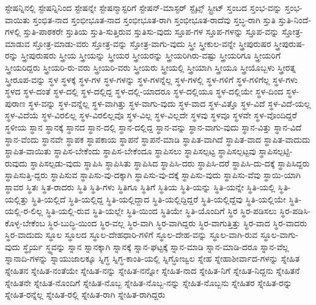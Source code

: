 {ಸ್ಟೇಷನ್ನಿನಲ್ಲಿ
ಸ್ಟೇಷನ್ನಿನಿಂದ
ಸ್ಟೇಷನ್ನೇ
ಸ್ಟೇಷನ್ಮಾಸ್ಟರಿಗೆ
ಸ್ಟೇಷನ್-ಮಾಸ್ಟರ್
ಸ್ಟೈಟ್ಸ್
ಸ್ಟ್ರೀಟ್
ಸ್ತಂಬದ
ಸ್ತಂಭ-ವನ್ನು
ಸ್ತಂಭ-ವಾಯಿತು
ಸ್ತಂಭಿತ-ನಾದ
ಸ್ತಂಭೀಭೂತ-ನಾದ
ಸ್ತಂಭೀಭೂತ-ರಾಗಿ
ಸ್ತಂಭೀಭೂತ-ರಾದೆವು
ಸ್ತಬ್ಧ-ರಾಗಿ
ಸ್ತುತಿ
ಸ್ತುತಿ-ನಿಂದೆ-ಗಳಲ್ಲಿ
ಸ್ತುತಿ-ಪಾಠಕರೇ
ಸ್ತುತಿಯ
ಸ್ತುತಿ-ಸುತ್ತಿರುವ
ಸ್ತುತಿಸು-ವುದು
ಸ್ತೂಪ-ಗಳ
ಸ್ತೂಪ-ಗಳನ್ನು
ಸ್ತೂಪ-ವನ್ನು
ಸ್ತೋತ್ರ-ಮಾಡುವ
ಸ್ತೋತ್ರ-ಮಾಡು-ವರು
ಸ್ತೋತ್ರ-ವನ್ನು
ಸ್ತೋತ್ರ-ವಾಗು-ವುದು
ಸ್ತ್ರೀ
ಸ್ತ್ರೀಕುಲ-ವನ್ನೇ
ಸ್ತ್ರೀಪುರುಷರ
ಸ್ತ್ರೀಪುರುಷ-ರನ್ನು
ಸ್ತ್ರೀಪುರುಷರು
ಸ್ತ್ರೀಯ
ಸ್ತ್ರೀಯನ್ನು
ಸ್ತ್ರೀಯರ
ಸ್ತ್ರೀಯರನ್ನು
ಸ್ತ್ರೀಯರಿಗಿರು-ವಷ್ಟು
ಸ್ತ್ರೀಯರಿಗೂ
ಸ್ತ್ರೀಯರಿಗೆ
ಸ್ತ್ರೀಯರಿದ್ದರು
ಸ್ತ್ರೀಯರಿ-ರು-ವರು
ಸ್ತ್ರೀಯರಿ-ವರು
ಸ್ತ್ರೀಯರು
ಸ್ತ್ರೀಯಲ್ಲಿ
ಸ್ತ್ರೀಯಾಗಿ
ಸ್ತ್ರೀಯೂ
ಸ್ತ್ರೀಯೊಬ್ಬಳು
ಸ್ತ್ರೀರತ್ನ
ಸ್ತ್ರೀರೂಪ-ವನ್ನು
ಸ್ಥಳ
ಸ್ಥಳಕ್ಕೆ
ಸ್ಥಳ-ಗಳ
ಸ್ಥಳ-ಗಳನ್ನು
ಸ್ಥಳ-ಗಳನ್ನೆಲ್ಲ
ಸ್ಥಳ-ಗಳಲ್ಲಿ
ಸ್ಥಳ-ಗಳಿಗೆ
ಸ್ಥಳ-ಗಳಿಗೆಲ್ಲ
ಸ್ಥಳ-ಗಳು
ಸ್ಥಳದ
ಸ್ಥಳ-ದಂತೆ
ಸ್ಥಳ-ದಲ್ಲಿ
ಸ್ಥಳ-ದಲ್ಲಿದ್ದ
ಸ್ಥಳ-ದಲ್ಲಿ-ಯಾದರೂ
ಸ್ಥಳ-ದಲ್ಲಿಯೂ
ಸ್ಥಳ-ದಲ್ಲಿಯೇ
ಸ್ಥಳ-ದಿಂದ
ಸ್ಥಳ-ಪುರಾಣ
ಸ್ಥಳ-ವನ್ನು
ಸ್ಥಳ-ವನ್ನೆಲ್ಲ
ಸ್ಥಳ-ವಾಗಿತ್ತು
ಸ್ಥಳ-ವಾಗು-ವುದು
ಸ್ಥಳ-ವಾದ
ಸ್ಥಳ-ವಿತ್ತೊ
ಸ್ಥಳ-ವಿದೆ
ಸ್ಥಳ-ವಿದೆ-ಯಲ್ಲ
ಸ್ಥಳ-ವಿದೆಯೆ
ಸ್ಥಳ-ವಿರಲಿಲ್ಲ
ಸ್ಥಳ-ವಿರಲಿಲ್ಲವೊ
ಸ್ಥಳ-ವಿಲ್ಲ
ಸ್ಥಳ-ವಿಲ್ಲದೇ
ಸ್ಥಳವು
ಸ್ಥಳವೂ
ಸ್ಥಳವೇ
ಸ್ಥಳ-ವೊಂದಿದ್ದರೆ
ಸ್ಥಳೀಯ
ಸ್ಥಾನ
ಸ್ಥಾನಕ್ಕೆ
ಸ್ಥಾನದ
ಸ್ಥಾನ-ದಲ್ಲಿ
ಸ್ಥಾನ-ದಲ್ಲಿದ್ದ
ಸ್ಥಾನ-ವನ್ನು
ಸ್ಥಾನ-ವಾಗು-ವುದು
ಸ್ಥಾನ-ವಿತ್ತು
ಸ್ಥಾನ-ವಿದೆ
ಸ್ಥಾನ-ವೆಂದು
ಸ್ಥಾನವೇ
ಸ್ಥಾಪಕ
ಸ್ಥಾಪಕಾಯ
ಸ್ಥಾಪನೆ
ಸ್ಥಾಪನೆ-ಮಾಡಿ
ಸ್ಥಾಪಿತ-ವಾಗಿದೆ
ಸ್ಥಾಪಿತ-ವಾದ
ಸ್ಥಾಪಿತ-ವಾದುದು
ಸ್ಥಾಪಿತ-ವಾಯಿತು
ಸ್ಥಾಪಿಸ-ಬೇಕೆಂದು
ಸ್ಥಾಪಿಸ-ಬೇಕೆಂದೂ
ಸ್ಥಾಪಿಸಲು
ಸ್ಥಾಪಿಸಲ್ಪಟ್ಟ
ಸ್ಥಾಪಿಸಲ್ಪಟ್ಟವು
ಸ್ಥಾಪಿಸಲ್ಪಟ್ಟಿ-ರುವುದು
ಸ್ಥಾಪಿಸಲ್ಪಡು-ವುದು
ಸ್ಥಾಪಿಸಿ
ಸ್ಥಾಪಿಸಿತು
ಸ್ಥಾಪಿಸಿದ
ಸ್ಥಾಪಿಸಿ-ದರು
ಸ್ಥಾಪಿಸಿ-ದರೆ
ಸ್ಥಾಪಿಸಿ-ದು-ದಕ್ಕೆ
ಸ್ಥಾಪಿಸಿದ್ದರು
ಸ್ಥಾಪಿಸುತ್ತಿ-ದ್ದರು
ಸ್ಥಾಪಿಸುವ
ಸ್ಥಾಪಿಸು-ವು-ದಕ್ಕಾಗಿ
ಸ್ಥಾಪಿಸು-ವು-ದಕ್ಕೆ
ಸ್ಥಾಪಿಸು-ವುದು
ಸ್ಥಾಪಿಸು-ವೆವು
ಸ್ಥಾಯಿ-ಯಾಗಿ
ಸ್ಥಾವರ
ಸ್ಥಿತಃ
ಸ್ಥಿತ-ರಾದರು
ಸ್ಥಿತಿ
ಸ್ಥಿತಿ-ಗಳು
ಸ್ಥಿತಿಗೂ
ಸ್ಥಿತಿಗೆ
ಸ್ಥಿತಿಯ
ಸ್ಥಿತಿ-ಯನ್ನು
ಸ್ಥಿತಿ-ಯನ್ನೇ
ಸ್ಥಿತಿ-ಯಲ್ಲಿ
ಸ್ಥಿತಿ-ಯಲ್ಲಿತ್ತು
ಸ್ಥಿತಿ-ಯಲ್ಲಿದೆ
ಸ್ಥಿತಿ-ಯಲ್ಲಿದ್ದ
ಸ್ಥಿತಿ-ಯಲ್ಲಿದ್ದಾದ
ಸ್ಥಿತಿ-ಯಲ್ಲಿದ್ದಿದ್ದರೆ
ಸ್ಥಿತಿ-ಯಲ್ಲಿದ್ದೆವು
ಸ್ಥಿತಿ-ಯಲ್ಲಿಯೇ
ಸ್ಥಿತಿ-ಯಲ್ಲಿ-ರ-ಲಿಲ್ಲ
ಸ್ಥಿತಿ-ಯಲ್ಲಿ-ರುವ
ಸ್ಥಿತಿ-ಯಲ್ಲೇ
ಸ್ಥಿತಿ-ಯಿಂದ
ಸ್ಥಿತಿಯೇ
ಸ್ಥಿತಿ-ಯೊಂದಿಗೆ
ಸ್ಥಿರ
ಸ್ಥಿರ-ಪಡಿಸಲು
ಸ್ಥಿರ-ಪಡಿಸಿ-ಕೊಳ್ಳ-ಬೇಕೆಂಬ
ಸ್ಥಿರ-ಬುದ್ಧಿ-ಯಿಂದ
ಸ್ಥಿರ-ವಲ್ಲ
ಸ್ಥಿರ-ವಾಗಿ
ಸ್ಥಿರ-ವಾಗಿದ್ದರು
ಸ್ಥಿರ-ವಾಗುತ್ತಿತ್ತು
ಸ್ಥಿರ-ವಾದ
ಸ್ಥಿರ-ವಾದರು
ಸ್ಥಿರ-ವಾದುದು
ಸ್ಥೂಲ
ಸ್ಥೂಲದ
ಸ್ಥೂಲ-ದೇಹಧಾರಿ-ಗಳಿಗೆ
ಸ್ಥೂಲ-ದೇಹ-ವನ್ನು
ಸ್ಥೂಲ-ವಾಗಿ-ರುವ
ಸ್ಥೂಲ-ವಾಗು-ವುದು
ಸ್ಥೈರ್ಯ
ಸ್ಥ್ಯವನ್ನು
ಸ್ನಾನ
ಸ್ನಾನಕ್ಕಾಗಿ
ಸ್ನಾನಕ್ಕೆ
ಸ್ನಾನ-ಘಟ್ಟಕ್ಕೆ
ಸ್ನಾನ-ಮಾಡಿ
ಸ್ನಾನ-ಮಾಡಿ-ದರೂ
ಸ್ನಾನ-ವೆಲ್ಲ
ಸ್ನಾನಾದಿ-ಗಳನ್ನು
ಸ್ನಾಯುಜಾಲಕ್ಕೂ
ಸ್ನಿಗ್ಧ
ಸ್ನಿಗ್ಧ-ಕಾಂತಿ-ಯಲ್ಲಿ
ಸ್ನಿಗ್ಧೋಜ್ವಲ
ಸ್ನೇಹ
ಸ್ನೇಹಾಶೀರ್ವಾದ-ಗಳನ್ನು
ಸ್ನೇಹಿತ
ಸ್ನೇಹಿತನ
ಸ್ನೇಹಿತ-ನಂತೆಯೇ
ಸ್ನೇಹಿತ-ನನ್ನು
ಸ್ನೇಹಿತ-ನನ್ನೋ
ಸ್ನೇಹಿತ-ನಾದ
ಸ್ನೇಹಿತ-ನಿಗೆ
ಸ್ನೇಹಿತ-ನಿದ್ದನು
ಸ್ನೇಹಿತನೆ
ಸ್ನೇಹಿತನೇ
ಸ್ನೇಹಿತ-ನೊಂದಿಗೆ
ಸ್ನೇಹಿತ-ನೊಬ್ಬ
ಸ್ನೇಹಿತ-ನೊಬ್ಬ-ನನ್ನು
ಸ್ನೇಹಿತ-ನೊಬ್ಬನು
ಸ್ನೇಹಿತರ
ಸ್ನೇಹಿತ-ರನ್ನು
ಸ್ನೇಹಿತ-ರನ್ನೆಲ್ಲ
ಸ್ನೇಹಿತ-ರಲ್ಲಿ
ಸ್ನೇಹಿತ-ರಾಗಿ
ಸ್ನೇಹಿತ-ರಾಗಿದ್ದರು
}

